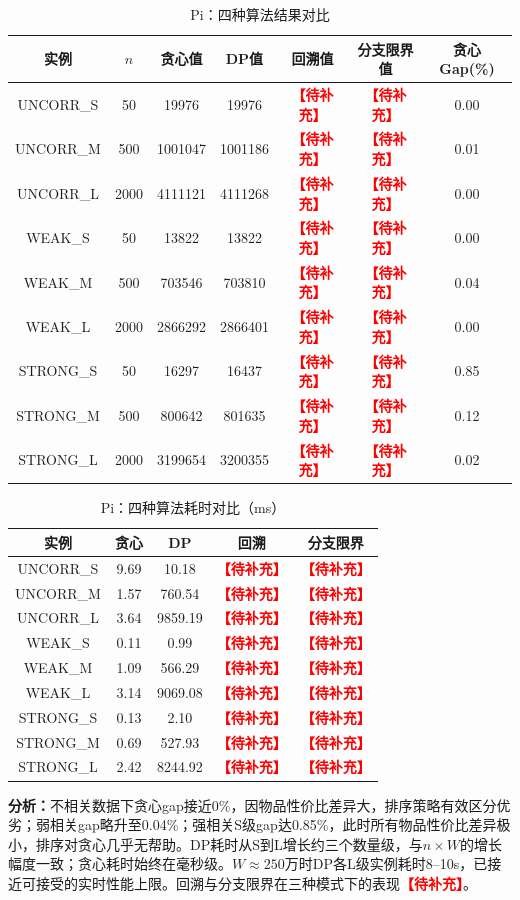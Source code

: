 \documentclass[6pt,a4paper]{ctexart}
\newcommand{\tb}{\textcolor{red}{\textbf{【待补充】}}}
\begin{document}
\begin{table}[ht]
\centering
\caption{Pi：四种算法结果对比}
\begin{tabular}{ccccccc}
\toprule
实例 & $n$ & 贪心值 & DP值 & 回溯值 & 分支限界值 & 贪心Gap(\%) \\
\midrule
UNCORR\_S & 50 & 19976 & 19976 & \tb & \tb & 0.00 \\
UNCORR\_M & 500 & 1001047 & 1001186 & \tb & \tb & 0.01 \\
UNCORR\_L & 2000 & 4111121 & 4111268 & \tb & \tb & 0.00 \\
WEAK\_S & 50 & 13822 & 13822 & \tb & \tb & 0.00 \\
WEAK\_M & 500 & 703546 & 703810 & \tb & \tb & 0.04 \\
WEAK\_L & 2000 & 2866292 & 2866401 & \tb & \tb & 0.00 \\
STRONG\_S & 50 & 16297 & 16437 & \tb & \tb & 0.85 \\
STRONG\_M & 500 & 800642 & 801635 & \tb & \tb & 0.12 \\
STRONG\_L & 2000 & 3199654 & 3200355 & \tb & \tb & 0.02 \\
\bottomrule
\end{tabular}
\end{table}

\begin{table}[ht]
\centering
\caption{Pi：四种算法耗时对比（ms）}
\begin{tabular}{ccccc}
\toprule
实例 & 贪心 & DP & 回溯 & 分支限界 \\
\midrule
UNCORR\_S & 9.69 & 10.18 & \tb & \tb \\
UNCORR\_M & 1.57 & 760.54 & \tb & \tb \\
UNCORR\_L & 3.64 & 9859.19 & \tb & \tb \\
WEAK\_S & 0.11 & 0.99 & \tb & \tb \\
WEAK\_M & 1.09 & 566.29 & \tb & \tb \\
WEAK\_L & 3.14 & 9069.08 & \tb & \tb \\
STRONG\_S & 0.13 & 2.10 & \tb & \tb \\
STRONG\_M & 0.69 & 527.93 & \tb & \tb \\
STRONG\_L & 2.42 & 8244.92 & \tb & \tb \\
\bottomrule
\end{tabular}
\end{table}

\textbf{分析：}不相关数据下贪心gap接近0\%，因物品性价比差异大，排序策略有效区分优劣；弱相关gap略升至0.04\%；强相关S级gap达0.85\%，此时所有物品性价比差异极小，排序对贪心几乎无帮助。DP耗时从S到L增长约三个数量级，与$n \times W$的增长幅度一致；贪心耗时始终在毫秒级。$W \approx 250$万时DP各L级实例耗时8--10s，已接近可接受的实时性能上限。回溯与分支限界在三种模式下的表现\tb。
\end{document}
